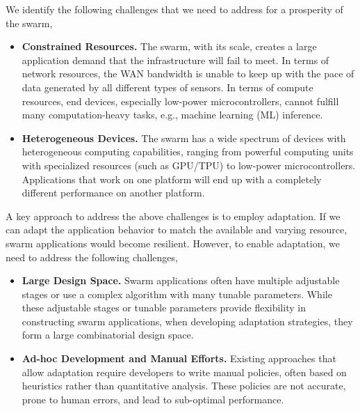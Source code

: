 \documentclass[thesis.tex]{subfiles}
\begin{document}
We identify the following challenges that we need to address for a prosperity of
the swarm,

\begin{itemize}[topsep=5pt, itemsep=2pt, leftmargin=10pt]

\item \textbf{Constrained Resources.} The swarm, with its scale, creates a large
  application demand that the infrastructure will fail to meet. In terms of
  network resources, the WAN bandwidth is unable to keep up with the pace of
  data generated by all different types of sensors. In terms of compute
  resources, end devices, especially low-power microcontrollers, cannot fulfill
  many computation-heavy tasks, e.g., machine learning (ML) inference.

\item \textbf{Heterogeneous Devices.} The swarm has a wide spectrum of devices
  with heterogeneous computing capabilities, ranging from powerful computing
  units with specialized resources (such as GPU/TPU) to low-power
  microcontrollers. Applications that work on one platform will end up with a
  completely different performance on another platform.

\end{itemize}

A key approach to address the above challenges is to employ adaptation. If we
can adapt the application behavior to match the available and varying resource,
swarm applications would become resilient. However, to enable adaptation, we
need to address the following challenges,

\begin{itemize}[topsep=5pt, itemsep=2pt, leftmargin=10pt]

\item \textbf{Large Design Space.} Swarm applications often have multiple
  adjustable stages or use a complex algorithm with many tunable
  parameters. While these adjustable stages or tunable parameters provide
  flexibility in constructing swarm applications, when developing adaptation
  strategies, they form a large combinatorial design space.

\item \textbf{Ad-hoc Development and Manual Efforts.} Existing approaches that
  allow adaptation require developers to write manual policies, often based on
  heuristics rather than quantitative analysis. These policies are not accurate,
  prone to human errors, and lead to sub-optimal performance.

\end{itemize}
\end{document}
